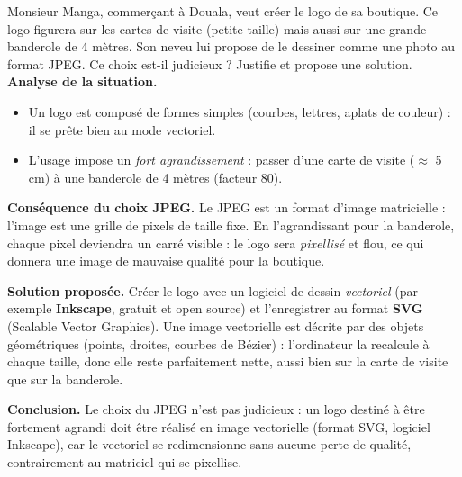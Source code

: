 \documentclass[11pt]{article}
\newcommand{\cle}[1]{{\popxbold\color{popdark}#1}}
\begin{document}
\begin{exoresolu}
Monsieur Manga, commerçant à Douala, veut créer le logo de sa boutique. Ce logo figurera sur les cartes de visite (petite taille) mais aussi sur une grande banderole de 4 mètres. Son neveu lui propose de le dessiner comme une photo au format JPEG. Ce choix est-il judicieux ? Justifie et propose une solution.
\tcblower
\textbf{Analyse de la situation.}
\begin{itemize}
\item Un logo est composé de formes simples (courbes, lettres, aplats de couleur) : il se prête bien au mode \cle{vectoriel}.
\item L'usage impose un \emph{fort agrandissement} : passer d'une carte de visite ($\approx$ 5 cm) à une banderole de 4 mètres (facteur 80).
\end{itemize}

\textbf{Conséquence du choix JPEG.} Le JPEG est un format d'image \cle{matricielle} : l'image est une grille de pixels de taille fixe. En l'agrandissant pour la banderole, chaque pixel deviendra un carré visible : le logo sera \emph{pixellisé} et flou, ce qui donnera une image de mauvaise qualité pour la boutique.

\textbf{Solution proposée.} Créer le logo avec un logiciel de dessin \emph{vectoriel} (par exemple \textbf{Inkscape}, gratuit et open source) et l'enregistrer au format \textbf{SVG} (Scalable Vector Graphics). Une image vectorielle est décrite par des objets géométriques (points, droites, courbes de Bézier) : l'ordinateur la recalcule à chaque taille, donc elle reste parfaitement nette, aussi bien sur la carte de visite que sur la banderole.

\textbf{Conclusion.} Le choix du JPEG n'est pas judicieux : un logo destiné à être fortement agrandi doit être réalisé en image vectorielle (format SVG, logiciel Inkscape), car le vectoriel se redimensionne sans aucune perte de qualité, contrairement au matriciel qui se pixellise.
\end{exoresolu}
\end{document}
